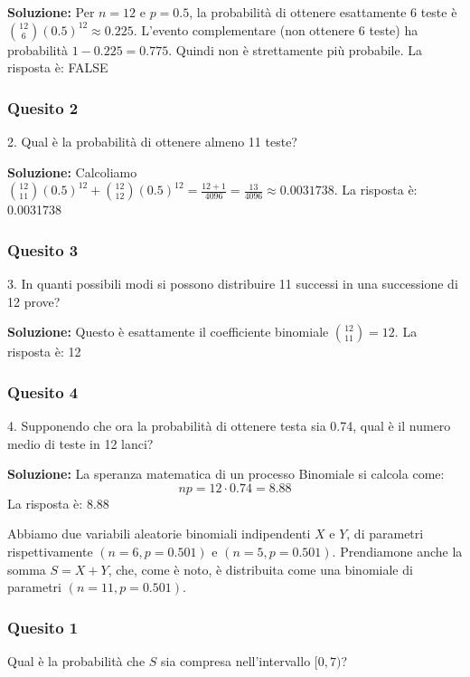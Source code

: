 \documentclass[12pt, a4paper]{article}
\begin{document}
\textbf{Soluzione:}
Per $n=12$ e $p=0.5$, la probabilità di ottenere esattamente 6 teste è $\binom{12}{6}(0.5)^{12} \approx 0.225$. L'evento complementare (non ottenere 6 teste) ha probabilità $1 - 0.225 = 0.775$. Quindi non è strettamente più probabile.
La risposta è: FALSE

\subsubsection*{Quesito 2}
2. Qual è la probabilità di ottenere almeno 11 teste?

\textbf{Soluzione:}
Calcoliamo $\binom{12}{11}(0.5)^{12} + \binom{12}{12}(0.5)^{12} = \frac{12 + 1}{4096} = \frac{13}{4096} \approx 0.0031738$.
La risposta è: 0.0031738

\subsubsection*{Quesito 3}
3. In quanti possibili modi si possono distribuire 11 successi in una successione di 12 prove?

\textbf{Soluzione:}
Questo è esattamente il coefficiente binomiale $\binom{12}{11} = 12$.
La risposta è: 12

\subsubsection*{Quesito 4}
4. Supponendo che ora la probabilità di ottenere testa sia 0.74, qual è il numero medio di teste in 12 lanci?

\textbf{Soluzione:}
La speranza matematica di un processo Binomiale si calcola come:
$$ np = 12 \cdot 0.74 = 8.88 $$
La risposta è: 8.88

\newpage

\vspace{0.5cm}
\begin{tcolorbox}[colback=lightergray!10, colframe=tocsec, title=\textbf{Esercizio 7}]
Abbiamo due variabili aleatorie binomiali indipendenti $X$ e $Y$, di parametri rispettivamente $(n=6, p=0.501)$ e $(n=5, p=0.501)$. Prendiamone anche la somma $S=X+Y$, che, come è noto, è distribuita come una binomiale di parametri $(n=11, p=0.501)$.
\end{tcolorbox}

\subsubsection*{Quesito 1}
Qual è la probabilità che $S$ sia compresa nell’intervallo $[0,7)$?
\end{document}
